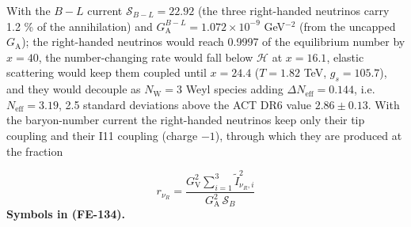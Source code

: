 \documentclass[
  10pt,
]{article}
\begin{document}
With the \(B - L\) current \(\mathcal{S}_{B-L} = 22.92\) (the three
right-handed neutrinos carry 1.2 \% of the annihilation) and
\(G_{\mathrm{A}}^{B-L} = 1.072\times10^{-9}\) GeV\(^{-2}\) (from the
uncapped \(G_{\mathrm{A}}\)); the right-handed neutrinos would reach
0.9997 of the equilibrium number by \(x = 40\), the number-changing rate
would fall below \(\mathcal{H}\) at \(x = 16.1\), elastic scattering
would keep them coupled until \(x = 24.4\) (\(T = 1.82\) TeV,
\(g_s = 105.7\)), and they would decouple as \(N_{\mathrm{W}} = 3\) Weyl
species adding \(\Delta N_{\mathrm{eff}} = 0.144\),
i.e.~\(N_{\mathrm{eff}} = 3.19\), 2.5 standard deviations above the ACT
DR6 value \(2.86 \pm 0.13\). With the baryon-number current the
right-handed neutrinos keep only their tip coupling and their I11
coupling (charge \(-1\)), through which they are produced at the
fraction

\[
r_{\nu_R} = \frac{G_{\mathrm{V}}^2\sum_{i=1}^{3}\tilde I_{\nu_R,i}^2}{G_{\mathrm{A}}^2\,\mathcal{S}_B}
 \tag{FE-134}
\] \textbf{Symbols in (FE-134).}
\end{document}
